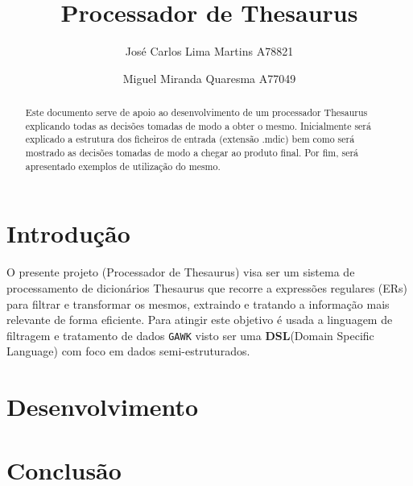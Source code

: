\documentclass{llncs}
\begin{document}
\mainmatter
\title{Processador de Thesaurus}
\author{José Carlos Lima Martins A78821 \and
        Miguel Miranda Quaresma A77049}

\maketitle

\justify

\begin{abstract}
Este documento serve de apoio ao desenvolvimento de um processador Thesaurus explicando todas as decisões tomadas de modo a obter o mesmo. Inicialmente será explicado a estrutura dos ficheiros de entrada (extensão .mdic) bem como será mostrado as decisões tomadas de modo a chegar ao produto final. Por fim, será apresentado exemplos de utilização do mesmo.
\end{abstract}

\section{Introdução}
O presente projeto (Processador de Thesaurus) visa ser um sistema de processamento de dicionários Thesaurus que recorre a expressões regulares (ERs) para filtrar e transformar os mesmos, extraindo e tratando a informação mais relevante de forma eficiente. Para atingir este objetivo é usada a linguagem de filtragem e tratamento de dados \texttt{GAWK} visto ser uma \textbf{DSL}(Domain Specific Language) com foco em dados semi-estruturados.


\section{Desenvolvimento}

\section{Conclusão}
\end{document}
